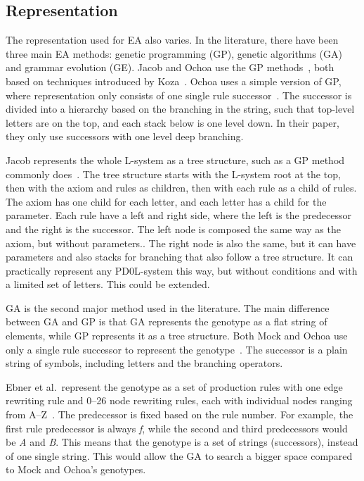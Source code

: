 \subsection{Representation}
The representation used for EA also varies.
In the literature, there have been three main EA methods: genetic programming (GP), genetic algorithms (GA) and grammar evolution (GE).
Jacob and Ochoa use the GP methods~\cite{1994Jacob,1995Jacob,1998Ochoa}, both based on techniques introduced by Koza~\cite{1992Koza}.
Ochoa uses a simple version of GP, where representation only consists of one single rule successor~\cite{1998Ochoa}.
The successor is divided into a hierarchy based on the branching in the string, such that top-level letters are on the top, and each stack below is one level down.
In their paper, they only use successors with one level deep branching.

Jacob represents the whole L-system as a tree structure, such as a GP method commonly does~\cite{1994Jacob}.
The tree structure starts with the L-system root at the top, then with the axiom and rules as children, then with each rule as a child of rules.
The axiom has one child for each letter, and each letter has a child for the parameter.
Each rule have a left and right side, where the left is the predecessor and the right is the successor.
The left node is composed the same way as the axiom, but without parameters..
The right node is also the same, but it can have parameters and also stacks for branching that also follow a tree structure.
It can practically represent any PD0L-system this way, but without conditions and with a limited set of letters.
This could be extended.

GA is the second major method used in the literature.
The main difference between GA and GP is that GA represents the genotype as a flat string of elements, while GP represents it as a tree structure.
Both Mock and Ochoa use only a single rule successor to represent the genotype~\cite{1998Mock,1998Ochoa}.
The successor is a plain string of symbols, including letters and the branching operators.

Ebner et al.\ represent the genotype as a set of production rules with one edge rewriting rule and 0--26 node rewriting rules, each with individual nodes ranging from A--Z~\cite{2002Ebner,2003Ebner}.
The predecessor is fixed based on the rule number.
For example, the first rule predecessor is always \textit{f}, while the second and third predecessors would be \textit{A} and \textit{B}.
This means that the genotype is a set of strings (successors), instead of one single string.
This would allow the GA to search a bigger space compared to Mock and Ochoa's genotypes.

